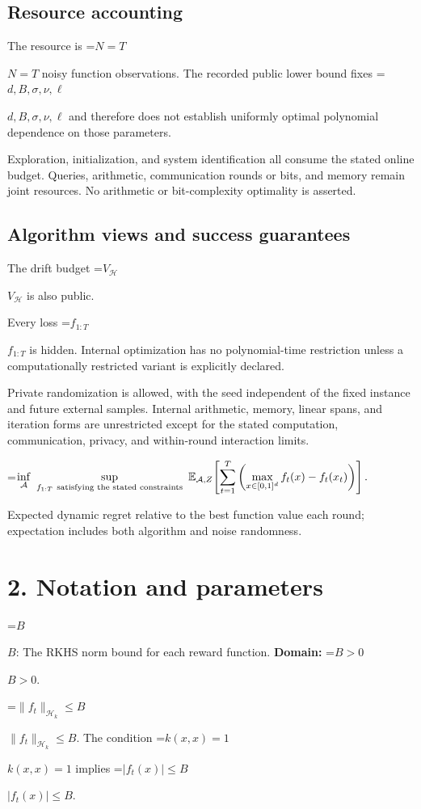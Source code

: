 \documentclass[10pt,a4paper]{article}
\newcommand{\AtlasMath}[1]{\par\begingroup\centering\setbox0=\hbox{$\displaystyle #1$}\ifdim\wd0>1.4\linewidth\typeout{ATLAS WIDE FORMULA: \the\wd0}\fi\ifdim\wd0>\linewidth\resizebox{\linewidth}{!}{\box0}\else\box0\fi\par\endgroup}
\newcommand{\AtlasInlineMath}[1]{\begingroup\setbox0=\hbox{$#1$}\ifdim\wd0>.4\linewidth\endgroup\AtlasMath{#1}\else\endgroup$#1$\fi}
\begin{document}
\subsection{Resource accounting}
The resource is \AtlasInlineMath{N=T} noisy function observations. The recorded public lower bound fixes \AtlasInlineMath{d,B,\sigma,\nu,\ell} and therefore does not establish uniformly optimal polynomial dependence on those parameters.

Exploration, initialization, and system identification all consume the stated online budget. Queries, arithmetic, communication rounds or bits, and memory remain joint resources. No arithmetic or bit-complexity optimality is asserted.

\subsection{Algorithm views and success guarantees}
The drift budget \AtlasInlineMath{V_{\mathcal H}} is also public.

Every loss \AtlasInlineMath{f_{1:T}} is hidden. Internal optimization has no polynomial-time restriction unless a computationally restricted variant is explicitly declared.

Private randomization is allowed, with the seed independent of the fixed instance and future external samples. Internal arithmetic, memory, linear spans, and iteration forms are unrestricted except for the stated computation, communication, privacy, and within-round interaction limits.


\AtlasMath{\inf_{\mathcal{A}}\ \sup_{f_{1:T}\ \text{\text{satisfying the stated constraints}}}\ \mathbb{E}_{\mathcal{A},Z}\!\left[\sum_{t=1}^{T}\left(\max_{x\in[0,1]^d}f_t(x)-f_t(x_t)\right)\right].}


Expected dynamic regret relative to the best function value each round; expectation includes both algorithm and noise randomness.

\section{2. Notation and parameters}
\AtlasInlineMath{B}: The RKHS norm bound for each reward function. \textbf{Domain:} \AtlasInlineMath{B>0}.

\AtlasInlineMath{\|f_t\|_{\mathcal H_k}\le B}. The condition \AtlasInlineMath{k(x,x)=1} implies \AtlasInlineMath{|f_t(x)|\le B}.
\end{document}
